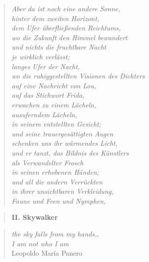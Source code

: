\begin{verse}
\itshape
Aber da ist noch eine andere Sonne,\\
hinter dem zweiten Horizont,\\
dem Ufer überfließenden Reichtums,\\
wo die Zukunft den Himmel bewandert\\
und nichts die fruchtbare Nacht\\
je wirklich verlässt;\\
langes Ufer der Nacht,\\
wo die ruhiggestellten Visionen des Dichters\\
auf eine Nachricht von Lou,\\
auf das Stichwort {\upshape Frida},\\
erwachen zu einem Lächeln,\\
ausuferndem Lächeln,\\
in seinem entstellten Gesicht;\\
und seine trauergesättigten Augen\\
schenken uns ihr wärmendes Licht,\\
und er tanzt, das {\upshape Bildnis des Künstlers}\\
als Verwandelter Frosch\\
in seinen erhobenen Händen;\\
und all die andern Verrückten\\
in ihrer unsichtbaren Verkleidung,\\
Faune und Feen und Nymphen,
\end{verse}

\clearpage

\begin{verse}
{\bfseries II. Skywalker}
\end{verse}

\begin{quote}
{\itshape the sky falls from my hands\ldots\\
I am not who I am}\\
\hspace*{2em}Leopoldo María Panero
\end{quote}

